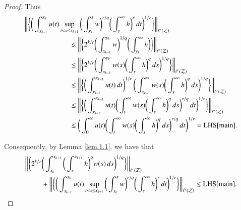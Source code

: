 \documentclass[12pt]{amsart}
\theoremstyle{plain}
\theoremstyle{definition}
\numberwithin{thm}{section}
\numberwithin{equation}{section}
\begin{document}
\begin{proof}
	Thus
	\begin{align*}
	\bigg\| \bigg\{ \bigg( \int_{x_{k-1}}^{x_k} u(t) \sup_{t < s \le x_{k+1}} \bigg(
	\int_{x_k}^s w \bigg)^{r / q} \bigg( \int_s^{\infty} h
	\bigg)^r \,dt\bigg)^{1/r} \bigg\} \bigg\|_{\ell^r({\mathcal Z})} & \\
	&\hspace{-5cm} \lesssim  \bigg\| \bigg\{ 2^{k / r} \bigg( \int_{x_{k-1}}^{y_k} w \bigg)^{1 / q} \bigg( \int_{y_k}^{\infty} h	\bigg) \bigg\} \bigg\|_{\ell^r({\mathcal Z})} \\
	& \hspace{-5cm} \le \bigg\| \bigg\{ 2^{k / r} \bigg( \int_{x_{k-1}}^{y_k} w (s) \bigg( \int_s^{\infty} h	\bigg)^q \,ds \bigg)^{1 / q} \bigg\} \bigg\|_{\ell^r({\mathcal Z})} \\
	&\hspace{-5cm} \lesssim \bigg\| \bigg\{ \bigg( \int_{x_{k-2}}^{x_{k-1}} u(t)\,dt \bigg)^{1 / r} \,\bigg( \int_{x_{k-1}}^{\infty} w (s) \bigg( \int_s^{\infty} h	\bigg)^q \,ds \bigg)^{1 / q}  \bigg\} \bigg\|_{\ell^r({\mathcal Z})}\\
	& \hspace{-5cm}\le \bigg\| \bigg\{ \bigg( \int_{x_{k-2}}^{x_{k-1}} u(t) \bigg( \int_t^{\infty} w (s) \bigg( \int_s^{\infty} h	\bigg)^q \,ds \bigg)^{r / q} \,dt \bigg)^{1/r} \bigg\} \bigg\|_{\ell^r({\mathcal Z})} \\
	& \hspace{-5cm} \le \bigg(\int_0^{\infty} u(t) \bigg( \int_t^{\infty} w (s) \bigg( \int_s^{\infty} h	\bigg)^q \,ds \bigg)^{r / q} \,dt \bigg)^{1/r} = {\operatorname{LHS}} \eqref{main}.
	\end{align*}

	Consequently, by Lemma \ref{lem.1.1}, we have that
	\begin{align*}
	\bigg\| \bigg\{ 2^{k / r} \bigg(
	\int_{x_k}^{x_{k+1}} \bigg( \int_s^{x_{k+1}} h \bigg)^q
	w(s)\,ds\bigg)^{ 1 / q} \bigg\} \bigg\|_{\ell^r({\mathcal Z})}  & \\
	& \hspace{-5cm}  +  \bigg\| \bigg\{ \bigg( \int_{x_{k-1}}^{x_k} u(t) \sup_{t < s \le x_{k+1}} \bigg(
	\int_{x_k}^s w \bigg)^{r / q} \bigg( \int_s^{\infty} h
	\bigg)^r \,dt\bigg)^{1/r} \bigg\} \bigg\|_{\ell^r({\mathcal Z})} \lesssim {\operatorname{LHS}}{\eqref{main}}.
	\end{align*}	
\end{proof}
\end{document}

